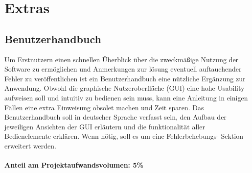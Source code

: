 \section{Extras}
    \subsection{Benutzerhandbuch}

    Um Erstnutzern einen schnellen Überblick über die zweckmäßige Nutzung der
    Software zu ermöglichen und Anmerkungen zur lösung eventuell auftauchender
    Fehler zu veröffentlichen ist ein Benutzerhandbuch eine nützliche Ergänzung
    zur Anwendung. Obwohl die graphische Nutzeroberfläche (GUI) eine hohe
    Usability aufweisen soll und intuitiv zu bedienen sein muss, kann eine
    Anleitung in einigen Fällen eine extra Einweisung obsolet machen und Zeit
    sparen. Das Benutzerhandbuch soll in deutscher Sprache verfasst sein, den
    Aufbau der jeweiligen Ansichten der GUI erläutern und die funktionalität
    aller Bedienelemente erklären. Wenn nötig, soll es um eine Fehlerbehebungs-
    Sektion erweitert werden.\\
    \\
    \textbf{Anteil am Projektaufwandsvolumen: 5\%}
